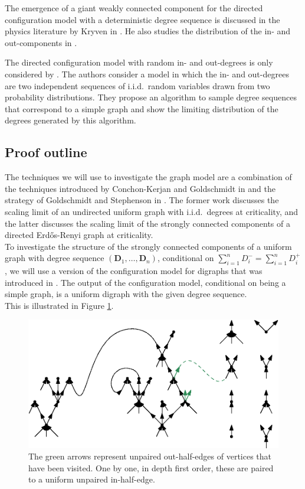 The emergence of a giant weakly connected component for the directed configuration model with a deterministic degree sequence is discussed in the physics literature by Kryven in \cite{Kryven2016}. He also studies the distribution of the in- and out-components in \cite{Kryven2017}.

The directed configuration model with random in- and out-degrees is only considered by \cite{Chen2012}. The authors consider a model in which the in- and out-degrees are two independent sequences of i.i.d.\ random variables drawn from two probability distributions. They propose an algorithm to sample degree sequences that correspond to a simple graph and show the limiting distribution of the degrees generated by this algorithm. 


\subsection{Proof outline}
The techniques we will use to investigate the graph model are a combination of the techniques introduced by Conchon-Kerjan and Goldschmidt in \cite{conchon--kerjanStableGraphMetric2020} and the strategy of Goldschmidt and Stephenson in \cite{goldschmidtScalingLimitCritical2019}. The former work discusses the scaling limit of an undirected uniform graph with i.i.d.\ degrees at criticality, and the latter discusses the scaling limit of the strongly connected components of a directed Erd\H{o}s-Renyi graph at criticality.\\
To investigate the structure of the strongly connected components of a uniform graph with degree sequence $(\mathbf{D}_1,\dots,\mathbf{D}_n)$, conditional on $\sum_{i=1}^n D^-_i=\sum_{i=1}^n D^+_i$, we will use a version of the configuration model for digraphs that was introduced in \cite{cooperSizeLargestStrongly2004}. The output of the configuration model, conditional on being a simple graph, is a uniform digraph with the given degree sequence. \\
 This is illustrated in Figure \ref{fig.configuration model}. 
\begin{figure}
    \centering
    \includegraphics[scale=0.6]{Content/Pictures/configuration_model.eps}
    \caption{The green arrows represent unpaired out-half-edges of vertices that have been visited. One by one, in depth first order, these are paired to a uniform unpaired in-half-edge.}
    \label{fig.configuration model}
\end{figure}\\
